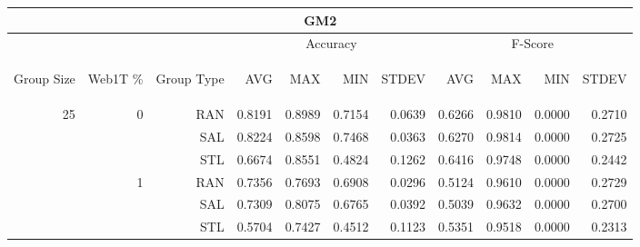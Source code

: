\begin{center}
\begin{table}[htbp] 
 \begin{center}
\begin{tabular}{ | r | r | r | r | r | r | r | r | r | r | r |}
\hline
\multicolumn{11}{|c|}{GM2}\\
\hline
 & & & \multicolumn{4}{|c|}{Accuracy} & \multicolumn{4}{|c|}{F-Score}\\ \cline{4-11}
\begin{sideways}Group Size\end{sideways} & \begin{sideways}Web1T \%\end{sideways} & \begin{sideways}Group Type\end{sideways} & \begin{sideways}AVG\end{sideways} & \begin{sideways}MAX\end{sideways} & \begin{sideways}MIN\end{sideways} & \begin{sideways}STDEV\end{sideways} & \begin{sideways}AVG\end{sideways} & \begin{sideways}MAX\end{sideways} & \begin{sideways}MIN\end{sideways} & \begin{sideways}STDEV\end{sideways}\\
\hline
\multirow{18}{*}{25}
 & \multirow{3}{*}{0} & RAN & 0.8191 & 0.8989 & 0.7154 & 0.0639 & 0.6266 & 0.9810 & 0.0000 & 0.2710\\ \cline{3-11}
 &   & SAL & 0.8224 & 0.8598 & 0.7468 & 0.0363 & 0.6270 & 0.9814 & 0.0000 & 0.2725\\ \cline{3-11}
 &   & STL & 0.6674 & 0.8551 & 0.4824 & 0.1262 & 0.6416 & 0.9748 & 0.0000 & 0.2442\\ \cline{2-11}
 & \multirow{3}{*}{1} & RAN & 0.7356 & 0.7693 & 0.6908 & 0.0296 & 0.5124 & 0.9610 & 0.0000 & 0.2729\\ \cline{3-11}
 &   & SAL & 0.7309 & 0.8075 & 0.6765 & 0.0392 & 0.5039 & 0.9632 & 0.0000 & 0.2700\\ \cline{3-11}
 &   & STL & 0.5704 & 0.7427 & 0.4512 & 0.1123 & 0.5351 & 0.9518 & 0.0000 & 0.2313\\ \cline{2-11}

\end{tabular}
\end{center}
\end{table}
\end{center}
